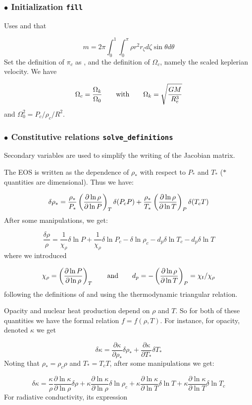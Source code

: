 \subsubsection{$\bullet$ \bf Initialization {\tt fill}}

Uses  and that

\[ m=2\pi\int_0^1\int_0^\pi\rho r^2r_\zeta d\zeta\sin\theta d\theta\]
Set the definition of $\pi_c$ as , and the definition of 
$\Omega_c$, namely the scaled keplerian velocity. We have

\[ \Omega_c=\frac{\Omega_k}{\Omega_0} {\qquad {\rm with}\qquad} \Omega_k=\sqrt{\frac{GM}{R_e^3}}\]
and $\Omega_0^2=P_c/\rho_c/R^2$.

\subsubsection{$\bullet$ \bf Constitutive relations {\tt solve\_definitions}}

Secondary variables are used to simplify the writing of the Jacobian
matrix.

The EOS is written as the dependence of $\rho_*$ with respect to $P_*$ and
$T_*$ ($*$ quantities are dimensional). Thus we have:

\[ \delta\rho_* = \frac{\rho_*}{P_*}\left(\frac{\partial\ln\rho}{\partial\ln
P}\right)_T\delta(P_cP) + \frac{\rho_*}{T_*}\left(\frac{\partial\ln\rho}{\partial\ln
T}\right)_P\delta(T_cT)\]
After some manipulations, we get:

\[ \frac{\delta\rho}{\rho} = \frac{1}{\chi_\rho}\delta\ln P +
\frac{1}{\chi_\rho}\delta\ln P_c -\delta\ln\rho_c - d_p\delta\ln T_c -
d_p\delta\ln T\]
where we introduced

\[ \chi_\rho = \left(\frac{\partial\ln P}{\partial\ln\rho}\right)_T \qquad {\rm and}\qquad d_p
= -\left(\frac{\partial\ln\rho}{\partial\ln T}\right)_P = \chi_t/\chi_\rho \]
following the definitions of \cite{RSI96} and using the thermodynamic
triangular relation.

\bigskip
Opacity and nuclear heat production depend on $\rho$ and $T$. So for both of
these quantities we have the formal relation $f=f(\rho,T)$. For instance, for
opacity, denoted $\kappa$ we get

\[ \delta\kappa = \frac{\partial\kappa}{\partial\rho_*}\delta\rho_* +
\frac{\partial\kappa}{\partial T_*}\delta T_*\]
Noting that $\rho_*=\rho_c\rho$ and $T_*=T_cT$, after some manipulations we
get:

\[ \delta\kappa =
\frac{\kappa}{\rho}\frac{\partial\ln\kappa}{\partial\ln\rho}\delta\rho +
\kappa\frac{\partial\ln\kappa}{\partial\ln\rho}\delta\ln\rho_c +
\kappa\frac{\partial\ln\kappa}{\partial\ln T}\delta\ln T +
\kappa\frac{\partial\ln\kappa}{\partial\ln T}\delta\ln T_c\]
For radiative conductivity, its expression

